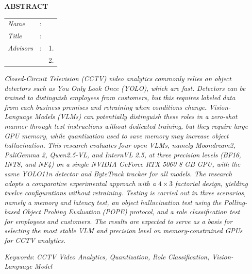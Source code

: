 \begin{center}
  \large\textbf{ABSTRACT}
\end{center}


\vspace{2ex}

\begingroup
\setlength{\tabcolsep}{0pt}

\noindent
\begin{tabularx}{\textwidth}{l >{\centering}m{3em} X}
  \emph{Name}     & : & \name{}         \\

  \emph{Title}    & : & \engtatitle{}   \\

  \emph{Advisors} & : & 1. \advisor{}   \\
                  &   & 2. \coadvisor{} \\
\end{tabularx}
\endgroup

\emph{
  Closed-Circuit Television (CCTV) video analytics commonly relies on object detectors such as You Only Look Once (YOLO), which are fast. Detectors can be trained to distinguish employees from customers, but this requires labeled data from each business premises and retraining when conditions change. Vision-Language Models (VLMs) can potentially distinguish these roles in a zero-shot manner through text instructions without dedicated training, but they require large GPU memory, while quantization used to save memory may increase object hallucination. This research evaluates four open VLMs, namely Moondream2, PaliGemma 2, Qwen2.5-VL, and InternVL 2.5, at three precision levels (BF16, INT8, and NF4) on a single NVIDIA GeForce RTX 5060 8 GB GPU, with the same YOLO11n detector and ByteTrack tracker for all models. The research adopts a comparative experimental approach with a $4 \times 3$ factorial design, yielding twelve configurations without retraining. Testing is carried out in three scenarios, namely a memory and latency test, an object hallucination test using the Polling-based Object Probing Evaluation (POPE) protocol, and a role classification test for employees and customers. The results are expected to serve as a basis for selecting the most stable VLM and precision level on memory-constrained GPUs for CCTV analytics.}

\emph{Keywords}: \emph{CCTV Video Analytics, Quantization, Role Classification, Vision-Language Model}
